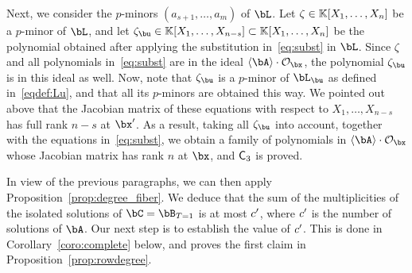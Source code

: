 \documentclass[12pt]{article}
\begin{document}
Next, we consider the $p$-minors $(a_{s+1},\dots,a_m)$ of $\bL$. Let $\zeta
\in\mathbb{K}[X_1,\dots,X_n]$ be a $p$-minor of $\bL$, and let $\zeta_\bu \in
\KK[X_1,\dots,X_{n-s}]\subset \KK[X_1,\dots,X_{n}]$ be the polynomial obtained after applying the
substitution in~\eqref{eq:subst} in $\bL$.  Since
$\zeta$ and all polynomials in~\eqref{eq:subst} are in the ideal $\langle \bA
\rangle \cdot \mathcal{O}_\bx$, the polynomial $\zeta_\bu$ is in this ideal as
well. Now, note that $\zeta_\bu$ is a $p$-minor of $\bL_\bu$ as defined
in~\eqref{eqdef:Lu}, and that all its $p$-minors are obtained this way. We
pointed out above that the Jacobian matrix of these equations with respect to
$X_1,\dots,X_{n-s}$ has full rank $n-s$ at $\bx'$. As a result, taking all
$\zeta_\bu$ into account, together with the equations in~\eqref{eq:subst}, we
obtain a family of polynomials in $\langle \bA \rangle \cdot \mathcal{O}_\bx$
whose Jacobian matrix has rank $n$ at $\bx$, and $\mathsf{C}_3$ is proved.

\medskip

In view of the previous paragraphs, we can then apply
Proposition~\ref{prop:degree_fiber}. We deduce that the sum of the
multiplicities of the isolated solutions of $\bC=\bB_{T=1}$ is at most
${c'}{}$, where ${c'}{}$ is the number of solutions of $\bA$. Our next step
is to establish the value of ${c'}{}$. This is done in
Corollary~\ref{coro:complete} below, and proves the first claim in
Proposition~\ref{prop:rowdegree}.
\end{document}
